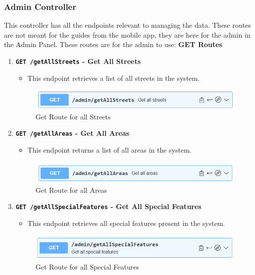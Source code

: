    \subsubsection{Admin Controller}
    This controller has all the endpoints relevant to managing the data. These routes are not meant for the guides from the mobile app, they are here for the admin in the Admin Panel. These routes are for the admin to use: \newline \newline
    \textbf{GET Routes}
    \begin{enumerate}
        \item \textbf{\texttt{GET /getAllStreets} - Get All Streets}
        \begin{itemize}
            \item This endpoint retrieves a list of all streets in the system.
        \end{itemize} 
        \begin{figure} [H]
            \centering
            \includegraphics [width=1\textwidth] {images/andreas/praxis/getAllStreets.png}
            \caption{Get Route for all Streets}
        \end{figure}

        \item \textbf{\texttt{GET /getAllAreas} - Get All Areas}
        \begin{itemize}
            \item This endpoint returns a list of all areas in the system.
        \end{itemize} 
        \begin{figure} [H]
            \centering
            \includegraphics [width=1\textwidth] {images/andreas/praxis/getAllAreas.png}
            \caption{Get Route for all Areas}
        \end{figure}

        \item \textbf{\texttt{GET /getAllSpecialFeatures} - Get All Special Features}
        \begin{itemize}
            \item This endpoint retrieves all special features present in the system.
        \end{itemize} 
        \begin{figure} [H]
            \centering
            \includegraphics [width=1\textwidth] {images/andreas/praxis/getAllSF.png}
            \caption{Get Route for all Special Features}
        \end{figure}
    \end{enumerate}

